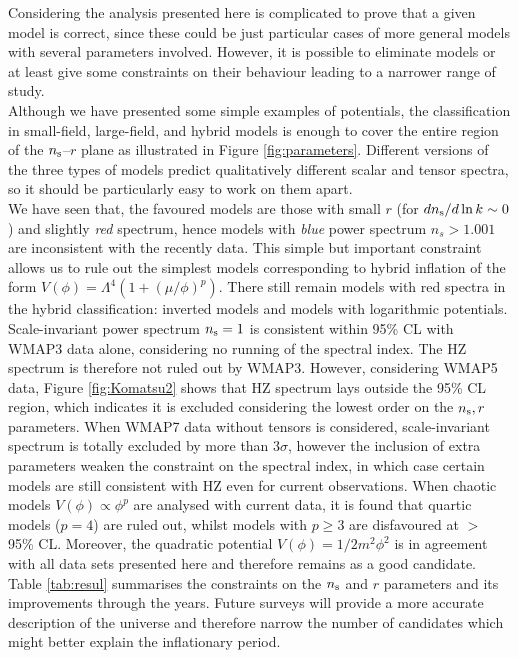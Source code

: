 \documentclass{rmaa}
\begin{document}
Considering the analysis presented here is complicated to prove 
that a given model is correct, since these could be just particular cases of more general 
models with several parameters involved. However, it is possible to eliminate models 
or at least give some constraints on their behaviour leading to a narrower range of study.
\\

Although we have presented some simple examples of potentials, 
the classification in small-field, large-field, and hybrid models is enough to 
cover the entire region of the $n_{\rm s}$--$r$ plane as illustrated in Figure \ref{fig:parameters}.  
Different versions of the three types of models predict qualitatively different
scalar and tensor spectra, so it should be particularly easy to work on
them apart.
\\

We have seen that, the favoured models are those with small $r$ (for $dn_{\rm s}/d\ln{k}\sim 0$)
and slightly \textit{red} spectrum, hence models with \textit{blue} power spectrum  $n_s > 1.001$
are inconsistent with the recently data. This simple but important constraint allows us to rule out
the simplest models corresponding to hybrid inflation of the form 
$V(\phi) = \Lambda^4(1 + (\mu / \phi)^{p})$. There still remain models with red spectra in 
the hybrid classification: inverted models and models with logarithmic potentials. 
\\

Scale-invariant power spectrum $n_{\rm s} = 1$ is consistent within 95\% CL with WMAP3 data 
alone, considering no running of the spectral index. The HZ spectrum 
is therefore not ruled out by WMAP3. However, considering WMAP5 data, 
Figure \ref{fig:Komatsu2} shows that HZ spectrum lays outside 
the 95\% CL region, which indicates it is excluded considering the lowest order 
on the $n_{\rm s}, r$ parameters. When WMAP7 data without tensors is considered, 
scale-invariant spectrum is totally excluded by more than $3 \sigma$, 
 however the inclusion of extra parameters weaken the constraint on the spectral index, in which case 
certain models are still consistent with HZ  even for current observations. 
When chaotic models $V(\phi)\propto\phi^p$ are analysed with current data, 
it is found that quartic models 
($p=4$) are ruled out, whilst models with $p\ge3$ are disfavoured at $>$ 95\% CL.
Moreover, the quadratic potential $V(\phi)= 1/2 m^2 \phi^2$ is in agreement
with all data sets presented here and therefore remains as a good candidate.
Table \ref{tab:resul} summarises the constraints on the $n_{\rm s}$ and $r$ parameters
and its improvements through the years.
Future surveys will  provide a more accurate description of the universe and therefore 
narrow the number of candidates which might better explain the inflationary period.
\end{document}
